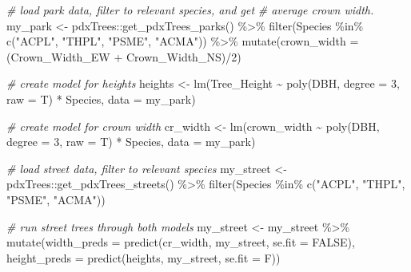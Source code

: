 \documentclass[12pt,twoside]{reedthesis}
\newenvironment{Shaded}{\begin{snugshade}}{\end{snugshade}}
\newcommand{\AttributeTok}[1]{\textcolor[rgb]{0.77,0.63,0.00}{#1}}
\newcommand{\CommentTok}[1]{\textcolor[rgb]{0.56,0.35,0.01}{\textit{#1}}}
\newcommand{\ConstantTok}[1]{\textcolor[rgb]{0.00,0.00,0.00}{#1}}
\newcommand{\DecValTok}[1]{\textcolor[rgb]{0.00,0.00,0.81}{#1}}
\newcommand{\FunctionTok}[1]{\textcolor[rgb]{0.00,0.00,0.00}{#1}}
\newcommand{\NormalTok}[1]{#1}
\newcommand{\OtherTok}[1]{\textcolor[rgb]{0.56,0.35,0.01}{#1}}
\newcommand{\SpecialCharTok}[1]{\textcolor[rgb]{0.00,0.00,0.00}{#1}}
\newcommand{\StringTok}[1]{\textcolor[rgb]{0.31,0.60,0.02}{#1}}
\begin{document}
\footnotesize
\begin{Shaded}
\begin{Highlighting}[]
\CommentTok{\# load park data, filter to relevant species, and get}
\CommentTok{\# average crown width.}
\NormalTok{my\_park }\OtherTok{\textless{}{-}}\NormalTok{ pdxTrees}\SpecialCharTok{::}\FunctionTok{get\_pdxTrees\_parks}\NormalTok{() }\SpecialCharTok{\%\textgreater{}\%}
    \FunctionTok{filter}\NormalTok{(Species }\SpecialCharTok{\%in\%} \FunctionTok{c}\NormalTok{(}\StringTok{"ACPL"}\NormalTok{, }\StringTok{"THPL"}\NormalTok{, }\StringTok{"PSME"}\NormalTok{, }\StringTok{"ACMA"}\NormalTok{)) }\SpecialCharTok{\%\textgreater{}\%}
    \FunctionTok{mutate}\NormalTok{(}\AttributeTok{crown\_width =}\NormalTok{ (Crown\_Width\_EW }\SpecialCharTok{+}\NormalTok{ Crown\_Width\_NS)}\SpecialCharTok{/}\DecValTok{2}\NormalTok{)}

\CommentTok{\# create model for heights}
\NormalTok{heights }\OtherTok{\textless{}{-}} \FunctionTok{lm}\NormalTok{(Tree\_Height }\SpecialCharTok{\textasciitilde{}} \FunctionTok{poly}\NormalTok{(DBH, }\AttributeTok{degree =} \DecValTok{3}\NormalTok{, }\AttributeTok{raw =}\NormalTok{ T) }\SpecialCharTok{*}
\NormalTok{    Species, }\AttributeTok{data =}\NormalTok{ my\_park)}

\CommentTok{\# create model for crown width}
\NormalTok{cr\_width }\OtherTok{\textless{}{-}} \FunctionTok{lm}\NormalTok{(crown\_width }\SpecialCharTok{\textasciitilde{}} \FunctionTok{poly}\NormalTok{(DBH, }\AttributeTok{degree =} \DecValTok{3}\NormalTok{, }\AttributeTok{raw =}\NormalTok{ T) }\SpecialCharTok{*}
\NormalTok{    Species, }\AttributeTok{data =}\NormalTok{ my\_park)}

\CommentTok{\# load street data, filter to relevant species}
\NormalTok{my\_street }\OtherTok{\textless{}{-}}\NormalTok{ pdxTrees}\SpecialCharTok{::}\FunctionTok{get\_pdxTrees\_streets}\NormalTok{() }\SpecialCharTok{\%\textgreater{}\%}
    \FunctionTok{filter}\NormalTok{(Species }\SpecialCharTok{\%in\%} \FunctionTok{c}\NormalTok{(}\StringTok{"ACPL"}\NormalTok{, }\StringTok{"THPL"}\NormalTok{, }\StringTok{"PSME"}\NormalTok{, }\StringTok{"ACMA"}\NormalTok{))}

\CommentTok{\# run street trees through both models}
\NormalTok{my\_street }\OtherTok{\textless{}{-}}\NormalTok{ my\_street }\SpecialCharTok{\%\textgreater{}\%}
    \FunctionTok{mutate}\NormalTok{(}\AttributeTok{width\_preds =} \FunctionTok{predict}\NormalTok{(cr\_width, my\_street, }\AttributeTok{se.fit =} \ConstantTok{FALSE}\NormalTok{),}
        \AttributeTok{height\_preds =} \FunctionTok{predict}\NormalTok{(heights, my\_street, }\AttributeTok{se.fit =}\NormalTok{ F))}


\end{Highlighting}
\end{Shaded}
\end{document}
